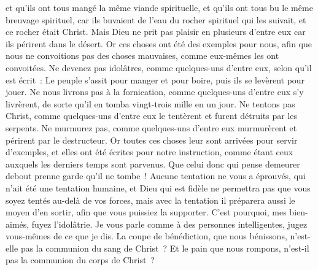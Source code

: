 \begin{multicols}{2}
et qu'ils ont tous mangé la même viande spirituelle,
et qu'ils ont tous bu le même breuvage spirituel, car ils buvaient de l'eau du rocher spirituel qui les suivait, et ce rocher était Christ.
Mais Dieu ne prit pas plaisir en plusieurs d'entre eux car ils périrent dans le désert.
Or ces choses ont été des exemples pour nous, afin que nous ne convoitions pas des choses mauvaises, comme eux-mêmes les ont convoitées.
Ne devenez pas idolâtres, comme quelques-uns d'entre eux, selon qu'il est écrit~: Le peuple s'assit pour manger et pour boire, puis ils se levèrent pour jouer.
Ne nous livrons pas à la fornication, comme quelques-uns d'entre eux s'y livrèrent, de sorte qu'il en tomba vingt-trois mille en un jour.
Ne tentons pas Christ, comme quelques-uns d'entre eux le tentèrent et furent détruits par les serpents.
Ne murmurez pas, comme quelques-uns d'entre eux murmurèrent et périrent par le destructeur.
Or toutes ces choses leur sont arrivées pour servir d'exemples, et elles ont été écrites pour notre instruction, comme étant ceux auxquels les derniers temps sont parvenus.
Que celui donc qui pense demeurer debout prenne garde qu'il ne tombe~!
Aucune tentation ne vous a éprouvés, qui n'ait été une tentation humaine, et Dieu qui est fidèle ne permettra pas que vous soyez tentés au-delà de vos forces, mais avec la tentation il préparera aussi le moyen d'en sortir, afin que vous puissiez la supporter.
C'est pourquoi, mes bien-aimés, fuyez l'idolâtrie.
Je vous parle comme à des personnes intelligentes, jugez vous-mêmes de ce que je dis.
La coupe de bénédiction, que nous bénissons, n'est-elle pas la communion du sang de Christ~? Et le pain que nous rompons, n'est-il pas la communion du corps de Christ~?

\end{multicols}
